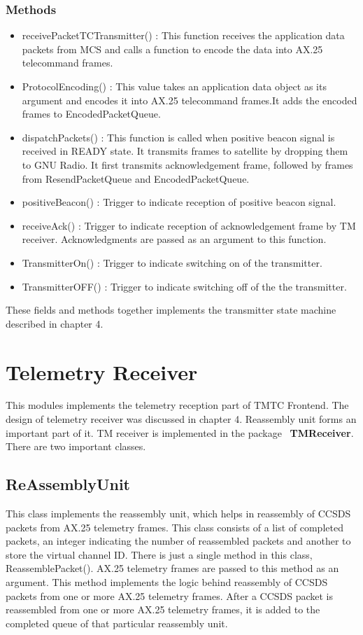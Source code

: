 \documentclass[BTech]{iitmdiss}
\begin{document}
\subsubsection{Methods}
\begin{itemize}
\item receivePacketTCTransmitter() : This function receives the application data packets from MCS and calls a function to encode the data into AX.25 telecommand frames.
\item ProtocolEncoding() : This value takes an application data object as its argument and encodes it into AX.25 telecommand frames.It adds the encoded frames to EncodedPacketQueue.
\item dispatchPackets() : This function is called when positive beacon signal is received in READY state. It transmits frames to satellite by dropping them to GNU Radio. It first transmits acknowledgement frame, followed by frames from ResendPacketQueue and EncodedPacketQueue.
\item positiveBeacon() : Trigger to indicate reception of positive  beacon signal.
\item receiveAck() : Trigger to indicate reception of acknowledgement frame by TM receiver. Acknowledgments are passed as an argument to this function.
\item TransmitterOn() : Trigger to indicate switching on of the transmitter.
\item TransmitterOFF() :  Trigger to indicate switching off of the the transmitter.
\end{itemize}

These fields and methods together implements the transmitter state machine described in chapter 4.

\section{Telemetry Receiver }
This modules implements the telemetry reception part of TMTC Frontend. The design of telemetry receiver was discussed in chapter 4. Reassembly unit forms an important part of it. TM receiver is implemented in the package ~\textbf{TMReceiver}. There are two important classes.
\subsection{ReAssemblyUnit}
This class implements the reassembly unit, which helps in reassembly of CCSDS packets from AX.25 telemetry frames. This class consists of a list of completed packets, an integer indicating the number of reassembled packets and another to store the virtual channel ID. There is just a single method in this class, ReassemblePacket(). AX.25 telemetry frames are passed to this method as an argument. This method implements the logic behind reassembly of CCSDS packets from one or more AX.25 telemetry frames. After a CCSDS packet is reassembled from one or more AX.25 telemetry frames, it is added to the completed queue of that particular reassembly unit.
\end{document}
